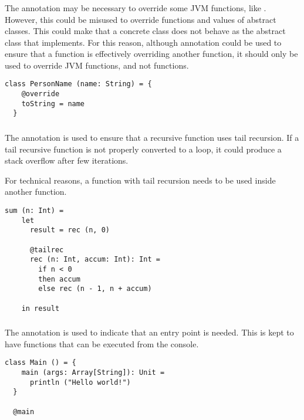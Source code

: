 \subsubsection{\sodaoverride}

The \sodaoverride annotation may be necessary to override some JVM functions, like .
However, this could be misused to override functions and values of abstract classes.
This could make that a concrete class does not behave as the abstract class that implements.
For this reason, although \sodaoverride annotation could be used to ensure that a function is effectively overriding another function, it should only be used to override JVM functions, and not \Soda functions.

\begin{lstlisting}[label={lst:exampleOverride}]
  class PersonName (name: String) = {
    @override
    toString = name
  }
\end{lstlisting}

\subsubsection{\sodatailrec}

The \sodatailrec annotation is used to ensure that a recursive function uses tail recursion.
If a tail recursive function is not properly converted to a loop, it could produce a stack overflow after few iterations.

For technical reasons, a function with tail recursion needs to be used inside another function.

\begin{lstlisting}[label={lst:exampleTailrecInside}]
  sum (n: Int) =
    let
      result = rec (n, 0)

      @tailrec
      rec (n: Int, accum: Int): Int =
        if n < 0
        then accum
        else rec (n - 1, n + accum)

    in result
\end{lstlisting}

\subsubsection{\sodamain}

The \sodamain annotation is used to indicate that an entry point is needed.
This is kept to have functions that can be executed from the console.

\begin{lstlisting}[label={lst:exampleMain}]
  class Main () = {
    main (args: Array[String]): Unit =
      println ("Hello world!")
  }

  @main
\end{lstlisting}

